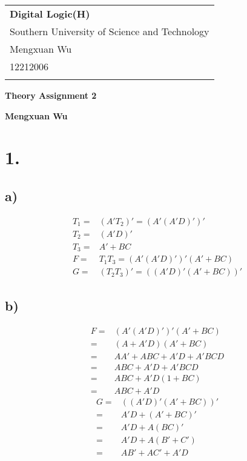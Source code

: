 \documentclass[a4paper,12pt]{article}
\begin{document}
\thispagestyle{empty} %

\begin{tabular}{p{15.5cm}}
{\large \bf Digital Logic(H)} \\
Southern University of Science and Technology \\ Mengxuan Wu \\ 12212006 \\
\hline
\\
\end{tabular}

\vspace*{0.3cm} %

\begin{center}
	{\Large \bf Theory Assignment 2}
	\vspace{2mm}

	{\bf Mengxuan Wu}
		
\end{center}  

\vspace{0.4cm}

\section*{1.}

\subsection*{a)}
\begin{align*}
	T_1 =& (A'T_2)' = (A'(A'D)')'\\
	T_2 =& (A'D)'\\
	T_3 =& A'+BC\\
	F =& T_1T_3 = (A'(A'D)')'(A'+BC)\\
	G =& (T_2T_3)' = ((A'D)'(A'+BC))'
\end{align*}

\subsection*{b)}
\begin{align*}
	F =& (A'(A'D)')'(A'+BC)\\
	=& (A+A'D)(A'+BC)\\
	=& AA'+ABC+A'D+A'BCD\\
	=& ABC+A'D+A'BCD\\
	=& ABC+A'D(1+BC)\\
	=& \boxed{ABC+A'D}
\end{align*}
\begin{align*}
	G =& ((A'D)'(A'+BC))'\\
	=& A'D+(A'+BC)'\\
	=& A'D+A(BC)'\\
	=& A'D+A(B'+C')\\
	=& \boxed{AB'+AC'+A'D}
\end{align*}
\end{document}
